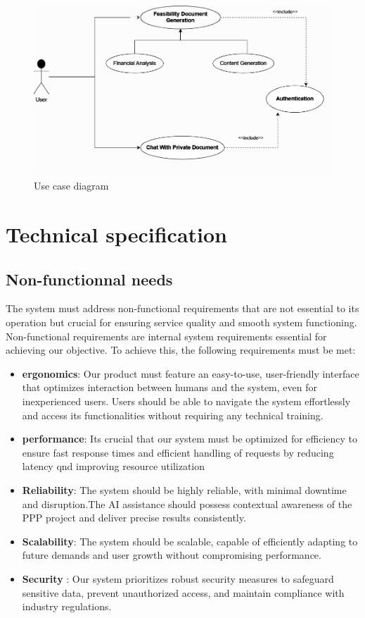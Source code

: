 \begin{figure}[h]
    \centering
    \includegraphics[width=1 \linewidth]{assets/diag.png}
    \caption{Use case diagram}
    \label{fig:usecase}
\end{figure}

\section{Technical specification}
\subsection{Non-functionnal needs}
The system must address non-functional requirements that are not essential to its operation but crucial for ensuring service quality and smooth system functioning. Non-functional requirements are internal system requirements essential for achieving our objective. To achieve this, the following requirements must be met:
\begin{itemize}
    \item \textbf{ergonomics}: Our product must feature an easy-to-use, user-friendly interface that optimizes interaction between humans and the system, even for inexperienced users. Users should be able to navigate the system effortlessly and access its functionalities without requiring any technical training.
    \item  \textbf{performance}:  Its crucial that our system must be optimized for efficiency to ensure fast response times and efficient handling of requests by reducing latency qnd improving resource utilization
    \item \textbf{Reliability}: The system should be highly reliable, with minimal downtime and disruption.The AI assistance should possess contextual awareness of the PPP project and deliver precise results consistently. 
    \item \textbf{Scalability}: The system should be scalable, capable of efficiently adapting to future demands and user growth without compromising performance.
    \item \textbf{Security }: Our system prioritizes robust security measures to safeguard sensitive data, prevent unauthorized access, and maintain compliance with industry regulations.  
\end{itemize}

